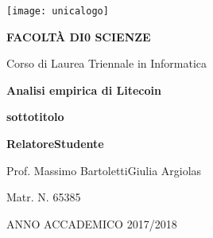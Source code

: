 \begin{spacing}{0.90}
\begin{center}
{\Large \thispagestyle{empty}}{\texttt{[image: unicalogo]}}\par
\end{center}
\end{spacing}

\noindent 
\begin{center}
\vspace{0.7cm}
\textbf{}\par
\end{center}{\LARGE \par}

\noindent 
\begin{center}
\textbf{\large FACOLT\`A DI0 SCIENZE}\par
\end{center}{\large \par}

\noindent
\begin{center}
{\large Corso di Laurea Triennale in Informatica}\par  %
\end{center}{\large \par}

\vspace{2.6cm}


\begin{center}
\textbf{\LARGE Analisi empirica di Litecoin}\par
\end{center}{\LARGE \par}

\begin{center}
\textbf{\large sottotitolo}\par
\end{center}{\LARGE \par}

\begin{spacing}{0.90}
\vspace{3.7cm}
\textbf{\large Relatore}{\large \hfill{}}\textbf{\large Studente}{\large \par}
\end{spacing}

{\large Prof. Massimo Bartoletti\hfill{}Giulia Argiolas~}{\large \par}

\begin{spacing}{0.90}
{\large \hfill{}Matr. N. 65385}{\large \par}
\end{spacing}

\vspace{2.5cm}


\begin{center}
ANNO ACCADEMICO 2017/2018\par 
\end{center}